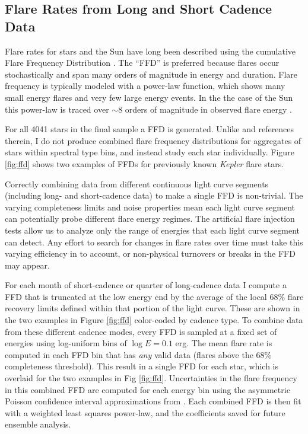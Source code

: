 \documentclass[twocolumn]{aastex6}
\newcommand{\Kepler}{\textsl{Kepler}\xspace}
\begin{document}
\subsection{Flare Rates from Long and Short Cadence Data}

Flare rates for stars and the Sun have long been described using the cumulative Flare Frequency Distribution \citep[e.g.][]{lme1976}. The ``FFD'' is preferred because flares occur stochastically and span many orders of magnitude in energy and duration. Flare frequency is typically modeled with a power-law function, which shows many small energy flares and very few large energy events. In the the case of the Sun this power-law is traced over $\sim$8 orders of magnitude in observed flare energy \citep{schrijver2012,maehara2015}.

For all 4041 stars in the final sample a FFD is generated. Unlike \citet{maehara2015} and references therein, I do not produce combined flare frequency distributions for aggregates of stars within spectral type bins, and instead study each star individually. Figure \ref{fig:ffd} shows two examples of FFDs for previously known \Kepler flare stars.

Correctly combining data from different continuous light curve segments (including long- and short-cadence data) to make a single FFD is non-trivial. The varying completeness limits and noise properties mean each light curve segment can potentially probe different flare energy regimes. The artificial flare injection tests allow us to analyze only the range of energies that each light curve segment can detect.
Any effort to search for changes in flare rates over time must take this varying efficiency in to account, or non-physical turnovers or breaks in the FFD may appear.

For each month of short-cadence or quarter of long-cadence data I compute a FFD that is truncated at the low energy end by the average of the local 68\% flare recovery limits defined within that portion of the light curve. These are shown in the two examples in Figure \ref{fig:ffd} color-coded by cadence type. To combine data from these different cadence modes, every FFD is sampled at a fixed set of energies using log-uniform bins of $\log E = 0.1$ erg. The mean flare rate is computed in each FFD bin that has {\it any} valid data (flares above the 68\% completeness threshold). This result in a single FFD for each star, which is overlaid for the two examples in Fig \ref{fig:ffd}. Uncertainties in the flare frequency in this combined FFD are computed for each energy bin using the asymmetric Poisson confidence interval approximations from \citet{gehrels1986}. Each combined FFD is then fit with a weighted least squares power-law, and the coefficients saved for future ensemble analysis.
\end{document}
